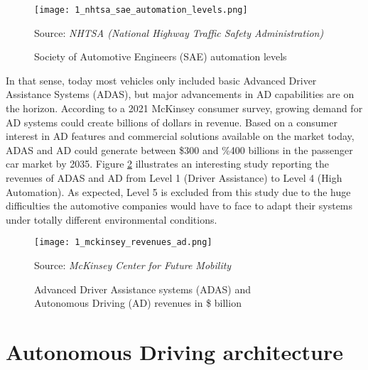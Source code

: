 \begin{figure}[h]
	\centering
	\texttt{[image: 1\_nhtsa\_sae\_automation\_levels.png]}
	\caption{Society of Automotive Engineers (SAE) automation levels}
    Source: \textit{NHTSA (National Highway Traffic Safety Administration)}
	\label{fig:1_nhtsa_sae_automation_levels}
\end{figure}

In that sense, today most vehicles only included basic Advanced Driver Assistance Systems (ADAS), but major advancements in AD capabilities are on the horizon. According to a 2021 McKinsey consumer survey, growing demand for \ac{AD} systems could create billions of dollars in revenue. Based on a consumer interest in \ac{AD} features and commercial solutions available on the market today, ADAS and AD could generate between \$300 and \%400 billions in the passenger car market by 2035. Figure \ref{fig:1_mckinsey_revenues_ad} illustrates an interesting study reporting the revenues of ADAS and AD from Level 1 (Driver Assistance) to Level 4 (High Automation). As expected, Level 5 is excluded from this study due to the huge difficulties the automotive companies would have to face to adapt their systems under totally different environmental conditions.

\begin{figure}[h]
	\centering
	\texttt{[image: 1\_mckinsey\_revenues\_ad.png]}
	\caption{Advanced Driver Assistance systems (ADAS) and \\ Autonomous Driving (AD) revenues in \$ billion} Source: \textit{McKinsey Center for Future Mobility}
	\label{fig:1_mckinsey_revenues_ad}
\end{figure}

\section{Autonomous Driving architecture}
\label{sec:1_ad_architecture}

